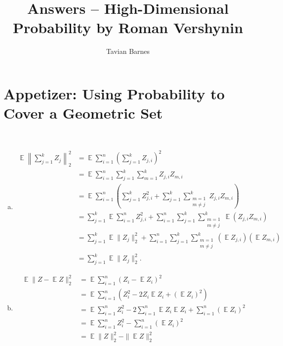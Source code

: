 \documentclass{report}
\title{Answers -- High-Dimensional Probability \linebreak[1] by Roman Vershynin}
\author{Tavian Barnes}
\date{}
\theoremstyle{definition}
\newenvironment{exercise}[1]{
  \renewcommand\theexerciseimpl{#1}
  \exerciseimpl
}{\endexerciseimpl}
\DeclareMathOperator{\E}{\mathbb{E}}
\begin{document}
\maketitle

\chapter*{Appetizer: Using Probability to Cover a Geometric Set}

\begin{exercise}{0.0.3}~
  \begin{enumerate}[(a)]
  \item
    \begin{align*}
      \E \left\| \sum_{j=1}^k Z_j \right\|_2^2 & = \E \sum_{i=1}^n \left(\sum_{j=1}^k Z_{j,i}\right)^2 \\
      & = \E \sum_{i=1}^n \sum_{j=1}^k \sum_{m=1}^k Z_{j,i} Z_{m,i} \\
      & = \E \sum_{i=1}^n \left(\sum_{j=1}^k Z_{j,i}^2 + \sum_{j=1}^k \sum_{\substack{m=1 \\ m \ne j}}^k Z_{j,i} Z_{m,i}\right) \\
      & = \sum_{j=1}^k \E \sum_{i=1}^n Z_{j,i}^2 + \sum_{i=1}^n \sum_{j=1}^k \sum_{\substack{m=1 \\ m \ne j}}^k \E (Z_{j,i} Z_{m,i}) \\
      & = \sum_{j=1}^k \E \|Z_j\|_2^2 + \sum_{i=1}^n \sum_{j=1}^k \sum_{\substack{m=1 \\ m \ne j}}^k (\E Z_{j,i}) (\E Z_{m,i}) \tag{by independence} \\
      & = \sum_{j=1}^k \E \|Z_j\|_2^2.
    \end{align*}

  \item
    \begin{align*}
      \E \|Z - \E{Z}\|_2^2 & = \E \sum_{i=1}^n (Z_i - \E{Z_i})^2 \\
      & = \E \sum_{i=1}^n (Z_i^2 - 2 Z_i \E{Z_i} + (\E{Z_i})^2) \\
      & = \E \sum_{i=1}^n Z_i^2 - 2 \sum_{i=1}^n \E Z_i \E{Z_i} + \sum_{i=1}^n (\E Z_i)^2 \\
      & = \E \sum_{i=1}^n Z_i^2 -  \sum_{i=1}^n (\E Z_i)^2 \\
      & = \E \|Z\|_2^2 - \|\E Z\|_2^2
    \end{align*}
  \end{enumerate}
\end{exercise}
\end{document}
